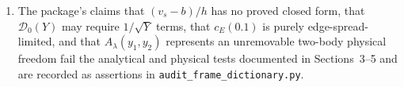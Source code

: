\documentclass[11pt,a4paper]{article}
\newcommand{\scr}{\texttt{audit\_\allowbreak frame\_\allowbreak dictionary.py}}
\begin{document}
\begin{enumerate}
$r=\pm i$ of $(1+r^2)^3$ was initially called on a symbol declared with
\texttt{positive=True} (which filtered out complex roots), and the three-body pairwise
sum initially used sequential \texttt{.subs(\{y1:y2, y2:y1\})} instead of simultaneous
\texttt{.xreplace}; all three were fixed in Check~4 without affecting the $2\times 2$
Krein separability determinant ($\frac{277}{1920000}\ne 0$).
\item The package's claims that $(v_s-b)/h$ has no proved closed form, that
$\mathcal D_0(Y)$ may require $1/\sqrt Y$ terms, that $c_E(0.1)$ is purely
edge-spread-limited, and that $A_\lambda(y_1,y_2)$ represents an unremovable
two-body physical freedom fail the analytical and physical tests documented in
Sections~3--5 and are recorded as assertions in \scr.
\end{enumerate}
\end{document}
